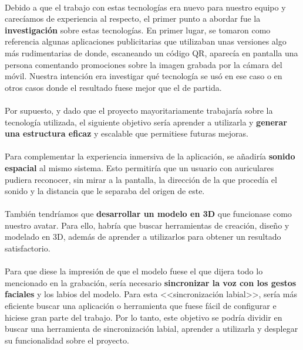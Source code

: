 \documentclass{subfiles}
\begin{document}
        \paragraph{}
        {Debido a que el trabajo con estas tecnologías era nuevo para nuestro equipo y carecíamos de experiencia al respecto, el primer punto a abordar fue la \textbf{investigación} sobre estas tecnologías. En primer lugar, se tomaron como referencia algunas aplicaciones publicitarias que utilizaban unas versiones algo más rudimentarias de \ra donde, escaneando un código QR, aparecía en pantalla una persona comentando promociones sobre la imagen grabada por la cámara del móvil. Nuestra intención era investigar qué tecnología se usó en ese caso o en otros casos donde el resultado fuese mejor que el de partida.}
        
        \paragraph{}
        {Por supuesto, y dado que el proyecto mayoritariamente trabajaría sobre la tecnología utilizada, el siguiente objetivo sería aprender a utilizarla y \textbf{generar una estructura eficaz} y escalable que permitiese futuras mejoras.}

        \paragraph{}
        {Para complementar la experiencia inmersiva de la aplicación, se añadiría \textbf{sonido espacial} al mismo sistema. Esto permitiría que un usuario con auriculares pudiera reconocer, sin mirar a la pantalla, la dirección de la que procedía el sonido y la distancia que le separaba del origen de este.}
        
        \paragraph{}
        {También tendríamos que \textbf{desarrollar un modelo en 3D} que funcionase como nuestro avatar. Para ello, habría que buscar herramientas de creación, diseño y modelado en 3D, además de aprender a utilizarlos para obtener un resultado satisfactorio.}
        
        \paragraph{}
        {Para que diese la impresión de que el modelo fuese el que dijera todo lo mencionado en la grabación, sería necesario \textbf{sincronizar la voz con los gestos faciales} y los labios del modelo. Para esta <<sincronización labial>>, sería más eficiente buscar una aplicación o herramienta que fuese fácil de configurar e hiciese gran parte del trabajo. Por lo tanto, este objetivo se podría dividir en buscar una herramienta de sincronización labial, aprender a utilizarla y desplegar su funcionalidad sobre el proyecto.}
        
\end{document}

